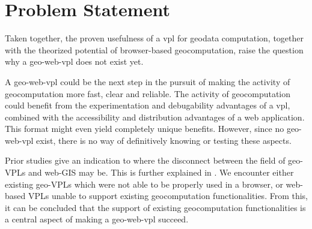 







\section{Problem Statement}
Taken together, the proven usefulness of a vpl for geodata computation, together with the theorized potential of browser-based geocomputation, raise the question why a \ac{geo-web-vpl} does not exist yet.

A \ac{geo-web-vpl} could be the next step in the pursuit of making the activity of geocomputation more fast, clear and reliable.
The activity of geocomputation could benefit from the experimentation and debugability advantages of a \ac{vpl}, combined with the accessibility and distribution advantages of a web application. 
This format might even yield completely unique benefits.
However, since no geo-web-vpl exist, there is no way of definitively knowing or testing these aspects. 

Prior studies give an indication to where the disconnect between the field of geo-VPLs and web-GIS may be. This is further explained in .
We encounter either existing geo-VPLs which were not able to be properly used in a browser, or web-based VPLs unable to support existing geocomputation functionalities. From this, it can be concluded that the support of existing geocomputation functionalities is a central aspect of making a geo-web-vpl succeed. 

